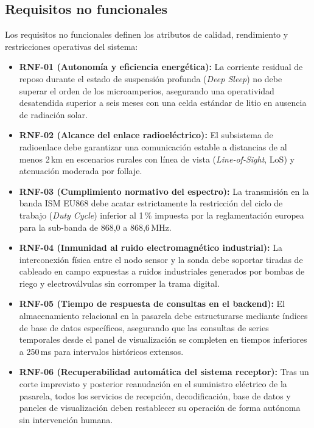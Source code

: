 \subsection{Requisitos no funcionales}
Los requisitos no funcionales definen los atributos de calidad, rendimiento y restricciones operativas del sistema:

\begin{itemize}
    \item \textbf{RNF-01 (Autonomía y eficiencia energética):} La corriente residual de reposo durante el estado de suspensión profunda (\textit{Deep Sleep}) no debe superar el orden de los microamperios, asegurando una operatividad desatendida superior a seis meses con una celda estándar de litio en ausencia de radiación solar.
    \item \textbf{RNF-02 (Alcance del enlace radioeléctrico):} El subsistema de radioenlace debe garantizar una comunicación estable a distancias de al menos 2\,km en escenarios rurales con línea de vista (\textit{Line-of-Sight}, LoS) y atenuación moderada por follaje.
    \item \textbf{RNF-03 (Cumplimiento normativo del espectro):} La transmisión en la banda ISM EU868 debe acatar estrictamente la restricción del ciclo de trabajo (\textit{Duty Cycle}) inferior al 1\,\% impuesta por la reglamentación europea para la sub-banda de 868,0 a 868,6\,MHz.
    \item \textbf{RNF-04 (Inmunidad al ruido electromagnético industrial):} La interconexión física entre el nodo sensor y la sonda debe soportar tiradas de cableado en campo expuestas a ruidos industriales generados por bombas de riego y electroválvulas sin corromper la trama digital.
    \item \textbf{RNF-05 (Tiempo de respuesta de consultas en el backend):} El almacenamiento relacional en la pasarela debe estructurarse mediante índices de base de datos específicos, asegurando que las consultas de series temporales desde el panel de visualización se completen en tiempos inferiores a 250\,ms para intervalos históricos extensos.
    \item \textbf{RNF-06 (Recuperabilidad automática del sistema receptor):} Tras un corte imprevisto y posterior reanudación en el suministro eléctrico de la pasarela, todos los servicios de recepción, decodificación, base de datos y paneles de visualización deben restablecer su operación de forma autónoma sin intervención humana.
\end{itemize}


